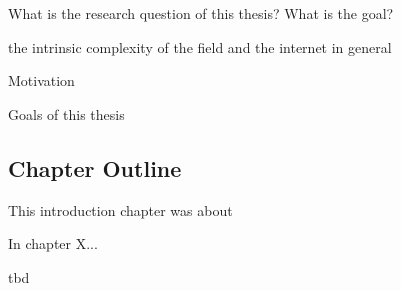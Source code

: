 What is the research question of this thesis?
What is the goal?

the intrinsic complexity of the field and the internet in general




Motivation


Goals of this thesis


\subsection{Chapter Outline}

This introduction chapter was about

In chapter X...

tbd











